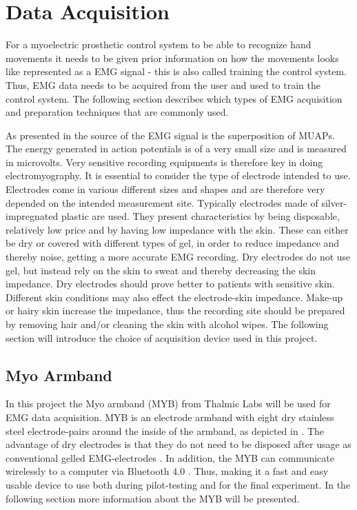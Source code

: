 \section{Data Acquisition} \label{sec:BG:dataAcquisition}
For a myoelectric prosthetic control system to be able to recognize hand movements it needs to be given prior information on how the movements looks like represented as a EMG signal - this is also called training the control system. Thus, EMG data needs to be acquired from the user and used to train the control system. The following section describes which types of EMG acquisition and preparation techniques that are commonly used.

As presented in  the source of the EMG signal is the superposition of MUAPs. The energy generated in action potentials is of a very small size and is measured in microvolts. Very sensitive recording equipments is therefore key in doing electromyography. It is essential to consider the type of electrode intended to use. Electrodes come in various different sizes and shapes and are therefore very depended on the intended measurement site. Typically electrodes made of silver-impregnated plastic are used. They present characteristics by being disposable, relatively low price and by having low impedance with the skin. %
These can either be dry or covered with different types of gel, in order to reduce impedance and thereby noise, getting a more accurate EMG recording. Dry electrodes do not use gel, but instead rely on the skin to sweat and thereby decreasing the skin impedance. Dry electrodes should prove better to patients with sensitive skin. Different skin conditions may also effect the electrode-skin impedance. Make-up or hairy skin increase the impedance, thus the recording site should be prepared by removing hair and/or cleaning the skin with alcohol wipes. \cite{Cram2012} The following section will introduce the choice of acquisition device used in this project.

\subsection{Myo Armband} \label{sub:BG:MYB}
In this project the Myo armband (MYB) from Thalmic Labs will be used for EMG data acquisition. MYB is an electrode armband with eight dry stainless steel electrode-pairs around the inside of the armband, as depicted in . The advantage of dry electrodes is that they do not need to be disposed after usage as conventional gelled EMG-electrodes \cite{Cram2012}. In addition, the MYB can communicate wirelessly to a computer via Bluetooth 4.0 \cite{Myoarmband2013}. Thus, making it a fast and easy usable device to use both during pilot-testing and for the final experiment. In the following section more information about the MYB will be presented.

